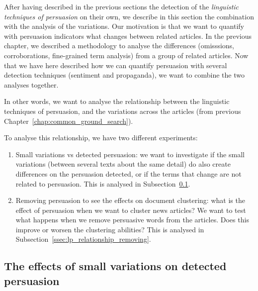 After having described in the previous sections the detection of the \emph{linguistic techniques of persuasion} on their own, we describe in this section the combination with the analysis of the variations.
Our motivation is that we want to quantify with persuasion indicators what changes between related articles.
In the previous chapter, we described a methodology to analyse the differences (omisssions, corroborations, fine-grained term analysis) from a group of related articles.
Now that we have here described how we can quantify persuasion with several detection techniques (sentiment and propaganda), we want to combine the two analyses together.

In other words, we want to analyse the relationship between the linguistic techniques of persuasion, and the variations across the articles (from previous Chapter~\ref{chap:common_ground_search}).

To analyse this relationship, we have two different experiments:

\begin{enumerate}
    \item Small variations vs detected persuasion: we want to investigate if the small variations (between several texts about the same detail) do also create differences on the persuasion detected, or if the terms that change are not related to persuasion. This is analysed in Subsection~\ref{ssec:lp_relationship_small_variations}.
    \item Removing persuasion to see the effects on document clustering: what is the effect of persuasion when we want to cluster news articles? We want to test what happens when we remove persuasive words from the articles. Does this improve or worsen the clustering abilities? This is analysed in Subsection~\ref{ssec:lp_relationship_removing}. %
\end{enumerate}

\subsection{\statusgreen The effects of small variations on detected persuasion}
\label{ssec:lp_relationship_small_variations}

